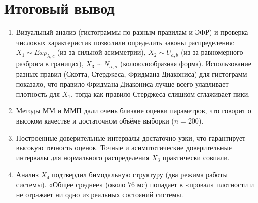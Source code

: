 \section{Итоговый вывод}

\begin{enumerate}
    \item Визуальный анализ (гистограммы по разным правилам и ЭФР) и проверка числовых характеристик позволили определить законы распределения: $X_1 \sim Exp_{\lambda,c}$ (из-за сильной асимметрии), $X_2 \sim U_{a,b}$ (из-за равномерного разброса в границах), $X_3 \sim N_{a,\sigma}$ (колоколообразная форма). Использование разных правил (Скотта, Стерджеса, Фридмана-Диакониса) для гистограмм показало, что правило Фридмана-Диакониса лучше всего улавливает плотность для $X_1$, тогда как правило Стерджеса слишком сглаживает пики.
    
    \item Методы ММ и ММП дали очень близкие оценки параметров, что говорит о высоком качестве и достаточном объёме выборки ($n = 200$).
    
    \item Построенные доверительные интервалы достаточно узки, что гарантирует высокую точность оценок. Точные и асимптотические доверительные интервалы для нормального распределения $X_3$ практически совпали.
    
    \item Анализ $X_4$ подтвердил бимодальную структуру (два режима работы системы). «Общее среднее» (около $76$ мс) попадает в «провал» плотности и не отражает ни одно из реальных состояний системы.
\end{enumerate}
